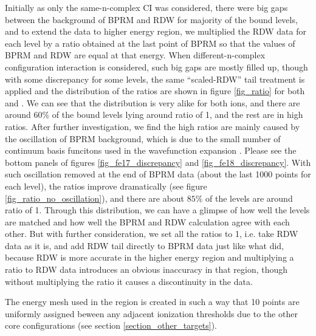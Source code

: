 Initially as only the same-n-complex CI was considered, there were big gaps between the background of BPRM and RDW for majority of the bound levels, and to extend the data to higher energy region, we multiplied the RDW data for each level by a ratio obtained at the last point of BPRM so that the values of BPRM and RDW are equal at that energy. When different-n-complex configuration interaction is considered, such big gaps are mostly filled up, though with some discrepancy for some levels, the same ``scaled-RDW'' tail treatment is applied and the distribution of the ratios are shown in figure \ref{fig_ratio} for both  and . We can see that the distribution is very alike for both ions, and there are around $60\%$ of the bound levels lying around ratio of 1, and the rest are in high ratios. After further investigation, we find the high ratios are mainly caused by the oscillation of BPRM background, which is due to the small number of continuum basis funcitons used in the wavefunction expansion \citep{zhang_1998}. Please see the bottom panels of figures \ref{fig_fe17_discrepancy} and \ref{fig_fe18_discrepancy}. With such oscillation removed at the end of BPRM data (about the last 1000 points for each level), the ratios improve dramatically (see figure \ref{fig_ratio_no_oscillation}), and there are about $85\%$ of the levels are around ratio of 1. Through this distribution, we can have a glimpse of how well the levels are matched and how well the BPRM and RDW calculation agree with each other. But with further consideration, we set all the ratios to 1, i.e. take RDW data as it is, and add RDW tail directly to BPRM data just like what \citet{zhang_1998} did, because RDW is more accurate in the higher energy region and multiplying a ratio to RDW data introduces an obvious inaccuracy in that region, though without multiplying the ratio it causes a discontinuity in the data.

The energy mesh used in the region is created in such a way that 10 points are uniformly assigned beween any adjacent ionization thresholds due to the other core configurations (see section \ref{section_other_targets}).

